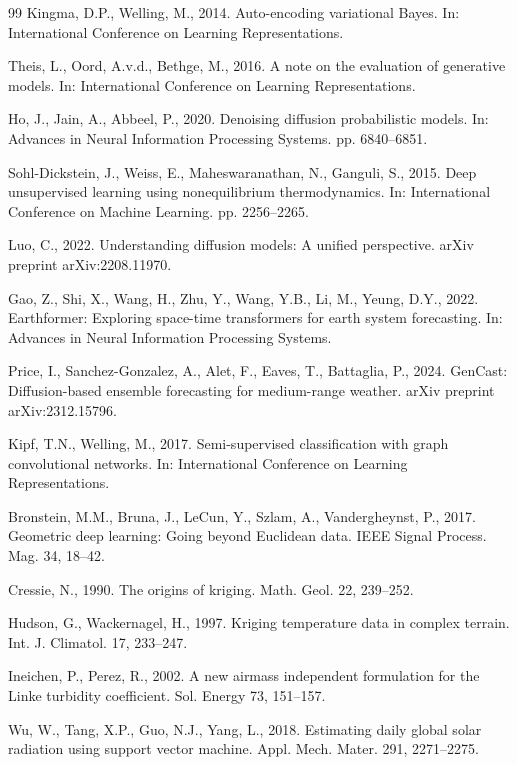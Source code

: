 \documentclass[preprint,12pt]{elsarticle}
\begin{document}
{\begin{thebibliography}{99}
Kingma, D.P., Welling, M., 2014. Auto-encoding variational Bayes. In: International Conference on Learning Representations.

Theis, L., Oord, A.v.d., Bethge, M., 2016. A note on the evaluation of generative models. In: International Conference on Learning Representations.

Ho, J., Jain, A., Abbeel, P., 2020. Denoising diffusion probabilistic models. In: Advances in Neural Information Processing Systems. pp. 6840--6851.

Sohl-Dickstein, J., Weiss, E., Maheswaranathan, N., Ganguli, S., 2015. Deep unsupervised learning using nonequilibrium thermodynamics. In: International Conference on Machine Learning. pp. 2256--2265.

Luo, C., 2022. Understanding diffusion models: A unified perspective. arXiv preprint arXiv:2208.11970.

Gao, Z., Shi, X., Wang, H., Zhu, Y., Wang, Y.B., Li, M., Yeung, D.Y., 2022. Earthformer: Exploring space-time transformers for earth system forecasting. In: Advances in Neural Information Processing Systems.

Price, I., Sanchez-Gonzalez, A., Alet, F., Eaves, T., Battaglia, P., 2024. GenCast: Diffusion-based ensemble forecasting for medium-range weather. arXiv preprint arXiv:2312.15796.

Kipf, T.N., Welling, M., 2017. Semi-supervised classification with graph convolutional networks. In: International Conference on Learning Representations.

Bronstein, M.M., Bruna, J., LeCun, Y., Szlam, A., Vandergheynst, P., 2017. Geometric deep learning: Going beyond Euclidean data. IEEE Signal Process. Mag. 34, 18--42.

Cressie, N., 1990. The origins of kriging. Math. Geol. 22, 239--252.

Hudson, G., Wackernagel, H., 1997. Kriging temperature data in complex terrain. Int. J. Climatol. 17, 233--247.

Ineichen, P., Perez, R., 2002. A new airmass independent formulation for the Linke turbidity coefficient. Sol. Energy 73, 151--157.

Wu, W., Tang, X.P., Guo, N.J., Yang, L., 2018. Estimating daily global solar radiation using support vector machine. Appl. Mech. Mater. 291, 2271--2275.


\end{thebibliography}}
\end{document}
